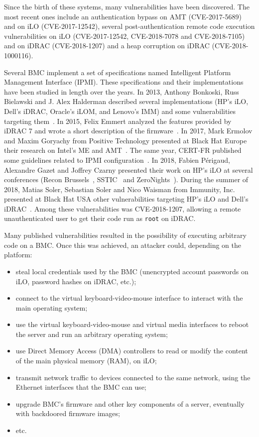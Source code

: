 Since the birth of these systems, many vulnerabilities have been discovered.
The most recent ones include an authentication bypass on AMT (CVE-2017-5689) and on iLO (CVE-2017-12542), several post-authentication remote code execution vulnerabilities on iLO (CVE-2017-12542, CVE-2018-7078 and CVE-2018-7105) and on iDRAC (CVE-2018-1207) and a heap corruption on iDRAC (CVE-2018-1000116).

Several BMC implement a set of specifications named Intelligent Platform Management Interface (IPMI). These specifications and their implementations have been studied in length over the years.
In 2013, Anthony Bonkoski, Russ Bielawski and J. Alex Halderman described several implementations (HP's iLO, Dell's iDRAC, Oracle's iLOM, and Lenovo's IMM) and some vulnerabilities targeting them~\cite{idrackar:usenix2013ipmi}.
In 2015, Felix Emmert analyzed the features provided by iDRAC 7 and wrote a short description of the firmware~\cite{idrackar:emmert2015idrac}.
In 2017, Mark Ermolov and Maxim Goryachy from Positive Technology presented at Black Hat Europe their research on Intel's ME and AMT~\cite{idrackar:bheu2017hack}.
The same year, CERT-FR published some guidelines related to IPMI configuration~\cite{idrackar:certfr2017ipmi}.
In 2018, Fabien Périgaud, Alexandre Gazet and Joffrey Czarny presented their work on HP's iLO at several conferences (Recon Brussels~\cite{idrackar:recon2018ilo}, SSTIC~\cite{idrackar:sstic2018ilo} and ZeroNights~\cite{idrackar:zeronights2018ilo}).
During the summer of 2018, Matias Soler, Sebastian Soler and Nico Waisman from Immunity, Inc. presented at Black Hat USA other vulnerabilities targeting HP's iLO and Dell's iDRAC~\cite{idrackar:bhus2018bmc}.
Among these vulnerabilities was CVE-2018-1207, allowing a remote unauthenticated user to get their code run as \texttt{root} on iDRAC.

Many published vulnerabilities resulted in the possibility of executing arbitrary code on a BMC.
Once this was achieved, an attacker could, depending on the platform:

\begin{itemize}
  \item steal local credentials used by the BMC (unencrypted account passwords on iLO, password hashes on iDRAC, etc.);
  \item connect to the virtual keyboard-video-mouse interface to interact with the main operating system;
  \item use the virtual keyboard-video-mouse and virtual media interfaces to reboot the server and run an arbitrary operating system;
  \item use Direct Memory Access (DMA) controllers to read or modify the content of the main physical memory (RAM), on iLO;
  \item transmit network traffic to devices connected to the same network, using the Ethernet interfaces that the BMC can use;
  \item upgrade BMC's firmware and other key components of a server, eventually with backdoored firmware images;
  \item etc.
\end{itemize}

